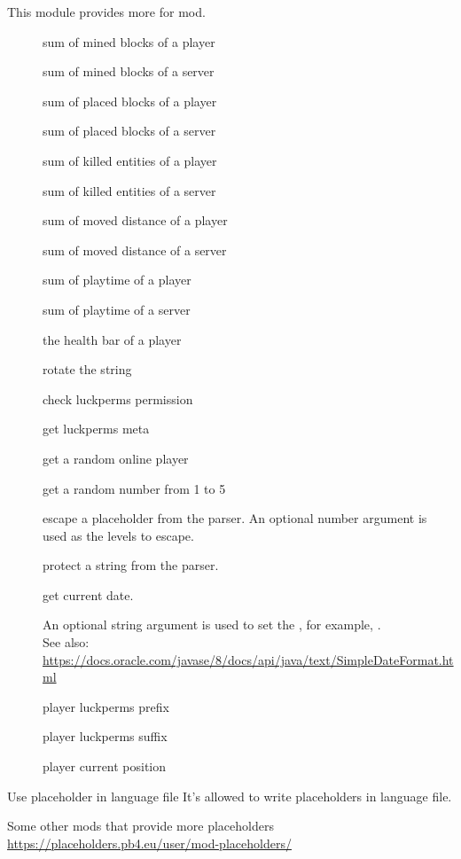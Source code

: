 This module provides more  for  mod.


\begin{description}
    \item [] sum of mined blocks of a player
    \item[] sum of mined blocks of a server
    \item[] sum of placed blocks of a player
    \item[] sum of placed blocks of a server
    \item[] sum of killed entities of a player
    \item[] sum of killed entities of a server
    \item[] sum of moved distance of a player
    \item[] sum of moved distance of a server
    \item[] sum of playtime of a player
    \item[] sum of playtime of a server
    \item[] the health bar of a player
    \item[] rotate the string 
    \item[] check luckperms permission
    \item[] get luckperms meta
    \item[] get a random online player
    \item[] get a random number from 1 to 5
    \item[] {escape a placeholder from the parser.
    An optional number argument is used as the levels to escape.}
    \item[] {protect a string from the parser.}
    \item[] {get current date.

    An optional string argument is used to set the , for example, .\\
    See also: \url{https://docs.oracle.com/javase/8/docs/api/java/text/SimpleDateFormat.html}}
    \item[] player luckperms prefix
    \item[] player luckperms suffix
    \item[] player current position
\end{description}


\begin{tips}{Use placeholder in language file}
    It's allowed to write placeholders in language file.
\end{tips}

\begin{note}{Some other mods that provide more placeholders}
    \url{https://placeholders.pb4.eu/user/mod-placeholders/}
\end{note}



